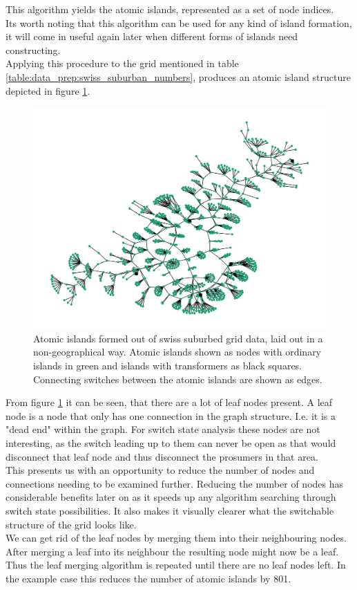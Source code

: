 This algorithm yields the atomic islands, represented as a set of node indices.\\
Its worth noting that this algorithm can be used for any kind of island formation,
it will come in useful again later when different forms of islands need constructing.\\

Applying this procedure to the grid mentioned in table \ref{table:data_prep:swiss_suburban_numbers},
produces an atomic island structure depicted in figure \ref{fig:data_prep:swiss_suburb_with_leafs}.

\begin{figure}[H]
    \begin{center}
        \includegraphics[width=.7\linewidth]{img/switchstate_exploring/swiss_suburb/topology_with_leafs.png}
    \end{center}
    \caption{
        Atomic islands formed out of swiss suburbed grid data, laid out in a non-geographical way.
        Atomic islands shown as nodes with 
        ordinary islands in green and islands with transformers as black squares. Connecting switches between the
        atomic islands are shown as edges.
    }
    \label{fig:data_prep:swiss_suburb_with_leafs}
\end{figure}

From figure \ref{fig:data_prep:swiss_suburb_with_leafs} it can be seen, that
there are a lot of leaf nodes present. A leaf node is a node that only has
one connection in the graph structure. I.e. it is a "dead end" within the graph.
For switch state analysis these nodes are not interesting, as the switch leading
up to them can never be open as that would disconnect that leaf node and thus
disconnect the prosumers in that area.\\
This presents us with an opportunity to
reduce the number of nodes and connections needing to be examined further. Reducing the number of
nodes has considerable benefits later on as it speeds up any algorithm
searching through switch state possibilities. It also makes it visually clearer
what the switchable structure of the grid looks like. \\
We can get rid of the leaf nodes by merging them into their neighbouring nodes. 
After merging a leaf into its neighbour the resulting node might now be a leaf. Thus 
the leaf merging algorithm is repeated until there are no leaf nodes left. In the example
case this reduces the number of atomic islands by 801.

